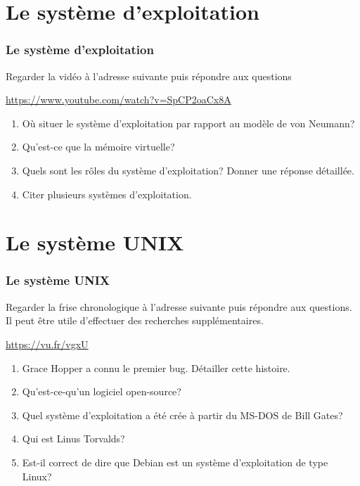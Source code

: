\documentclass[svgnames,11pt]{beamer}
\begin{document}
\section{Le système d'exploitation}
\begin{frame}
    \frametitle{Le système d'exploitation}

    \begin{activite}
        Regarder la vidéo à l'adresse suivante puis répondre aux questions
        \begin{center}
        \url{https://www.youtube.com/watch?v=SpCP2oaCx8A}
        \end{center}
        \begin{enumerate}
        \item Où situer le système d'exploitation par rapport au modèle de von Neumann?
        \item Qu'est-ce que la mémoire virtuelle?
        \item Quels sont les rôles du système d'exploitation? Donner une réponse détaillée.
        \item Citer plusieurs systèmes d'exploitation.
        \end{enumerate}
        \end{activite}
    

\end{frame}
\section{Le système UNIX}
\begin{frame}
    \frametitle{Le système UNIX}

    \begin{activite}
        Regarder la frise chronologique à l'adresse suivante puis répondre aux questions. Il peut être utile d'effectuer des recherches supplémentaires.
        \begin{center}
        \href{https://cdn.knightlab.com/libs/timeline3/latest/embed/index.html?source=1aroW_4ry_iAT3EiVA8aiR6DhcdzIwMU2uymPzkb7UAs&font=Default&lang=fr&initial_zoom=2&height=650}
        {https://vu.fr/vgxU}\end{center}
        \begin{enumerate}
        \item Grace Hopper a connu le premier bug. Détailler cette histoire.
        \item Qu'est-ce-qu'un logiciel open-source?
        \item Quel système d'exploitation a été crée à partir du MS-DOS de Bill Gates?
        \item Qui est Linus Torvalds?
        \item Est-il correct de dire que Debian est un système d'exploitation de type Linux?
        \end{enumerate}
        \end{activite}

\end{frame}
\end{document}
